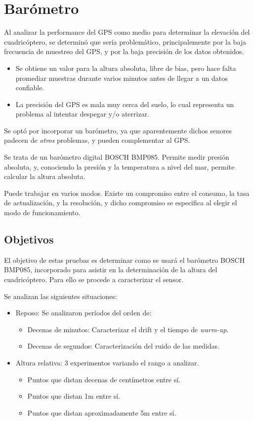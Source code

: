 \documentclass[spanish,12pt,a4paper,titlepage]{report}
\begin{document}
\chapter{Barómetro}
\label{chap:barometro}

Al analizar la performance del GPS como medio para determinar la elevación del cuadricóptero, se determinó que sería problemático, principalemente por la baja frecuencia de muestreo del GPS, y por la baja precisión de los datos obtenidos.
\begin{itemize}
\item Se obtiene un valor para la altura absoluta, libre de bias, pero hace falta promediar muestras durante varios minutos antes de llegar a un datos confiable.
\item  La precisión del GPS es mala muy cerca del suelo, lo cual representa un problema al intentar despegar y/o aterrizar.
\end{itemize}

Se optó por incorporar un barómetro, ya que aparentemente dichos senores padecen de \textit{otros} problemas, y pueden complementar al GPS.

Se trata de un barómetro digital BOSCH BMP085. Permite medir presión absoluta, y, conociendo la presión y la temperatura a nivel del mar, permite calcular la altura absoluta.

Puede trabajar en varios modos. Existe un compromiso entre el consumo, la tasa de actualización, y la resolución, y dicho compromiso se especifica al elegir el modo de funcionamiento.

\section{Objetivos}

El objetivo de estas pruebas es determinar como se usará el barómetro BOSCH BMP085, incorporado para asistir en la determinación de la altura del cuadricóptero. Para ello se procede a caracterizar el sensor.

Se analizan las siguientes situaciones:

\begin{itemize}
\item Reposo: Se analizaron períodos del orden de:
  \begin{itemize}
  \item Decenas de minutos: Caracterizar el drift y el tiempo de \textit{warm-up}.
  \item Decenas de segundos: Caracterización del ruido de las medidas.
  \end{itemize}
\item Altura relativa: 3 experimentos variando el rango a analizar.
  \begin{itemize}
  \item Puntos que distan decenas de centímetros entre sí.
  \item Puntos que distan 1m entre sí.
  \item Puntos que distan aproximadamente 5m entre sí.
  \end{itemize}
\end{itemize}
\end{document}
